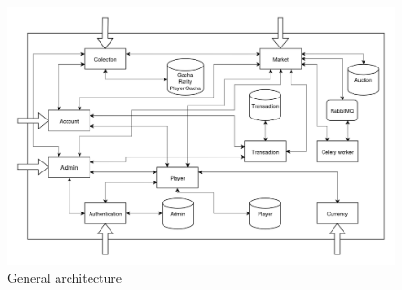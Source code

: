 \documentclass{article}
\begin{document}
\begin{figure}[ht]
    \centering
    \includegraphics[width=12cm]{architecture/architecture-v2.drawio.png}
    \caption{General architecture}
    \label{fig:general_architecture}
\end{figure}
\end{document}
